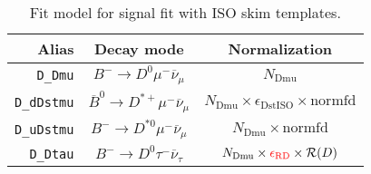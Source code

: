 \begin{landscape}
\begin{table}
\centering
\caption{
    Fit model for \Dz signal fit with ISO skim templates.
}
\scriptsize

\begin{tabular}{r|c|c}
\toprule
           \textbf{Alias} &                                 \textbf{Decay mode}                                  &                                                                                                                                                                             \textbf{Normalization}                                                                                                                                                                             \\
\midrule
          \texttt{D\_Dmu} &                    $B^- \rightarrow D^0 \mu^- \overline{\nu}_\mu$                    &                                                                                                                                                                                 $N_\text{Dmu}$                                                                                                                                                                                 \\
       \texttt{D\_dDstmu} &             $\overline{B}^0 \rightarrow D^{*+} \mu^- \overline{\nu}_\mu$             &                                                                                                                                                       $N_\text{Dmu} \times \epsilon_\text{DstISO} \times \text{normfd}$                                                                                                                                                        \\
       \texttt{D\_uDstmu} &                  $B^- \rightarrow D^{*0} \mu^- \overline{\nu}_\mu$                   &                                                                                                                                                                      $N_\text{Dmu} \times \text{normfd}$                                                                                                                                                                       \\
         \texttt{D\_Dtau} &                   $B^- \rightarrow D^0 \tau^- \overline{\nu}_\tau$                   &                                                                                                                                                $N_\text{Dmu} \times \textcolor{red}{\epsilon_\text{RD}} \times \mathcal{R}(D)$                                                                                                                                                 \\

\end{tabular}
\end{table}
\end{landscape}
